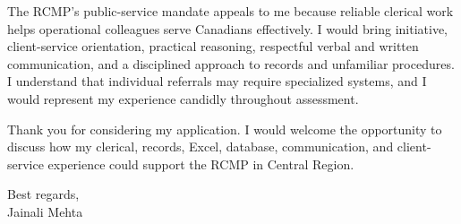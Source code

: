 \documentclass[letterpaper,11pt]{article}
\begin{document}
\bigbreak
The RCMP's public-service mandate appeals to me because reliable clerical work helps operational colleagues serve Canadians effectively. I would bring initiative, client-service orientation, practical reasoning, respectful verbal and written communication, and a disciplined approach to records and unfamiliar procedures. I understand that individual referrals may require specialized systems, and I would represent my experience candidly throughout assessment.

\bigbreak
Thank you for considering my application. I would welcome the opportunity to discuss how my clerical, records, Excel, database, communication, and client-service experience could support the RCMP in Central Region.

\bigbreak
Best regards,\\
Jainali Mehta
\end{document}
